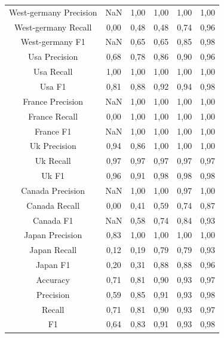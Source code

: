 \documentclass{classrep}
\begin{document}
\begin{table}[h!]
\begin{tabular}{c c c c c c}
\hline
West-germany Precision 	& NaN & 1,00 & 1,00 & 1,00 & 1,00\\
West-germany Recall 		& 0,00 & 0,48 & 0,48 & 0,74 & 0,96\\
West-germany F1		& NaN & 0,65 & 0,65 & 0,85 & 0,98\\
\hline
Usa Precision 			& 0,68 & 0,78 & 0,86 & 0,90 & 0,96\\
Usa Recall				& 1,00 & 1,00 & 1,00 & 1,00 & 1,00\\
Usa F1			 	& 0,81 & 0,88 & 0,92 & 0,94 & 0,98\\
\hline
France Precision 		& NaN & 1,00 & 1,00 & 1,00 & 1,00\\
France Recall 			& 0,00 & 1,00 & 1,00 & 1,00 & 1,00\\
France F1 				& NaN & 1,00 & 1,00 & 1,00 & 1,00\\
\hline
Uk Precision 			& 0,94 & 0,86 & 1,00 & 1,00 & 1,00\\
Uk Recall 				& 0,97 & 0,97 & 0,97 & 0,97 & 0,97\\
Uk F1 				& 0,96 & 0,91 & 0,98 & 0,98 & 0,98\\
\hline
Canada Precision		& NaN & 1,00 & 1,00 & 0,97 & 1,00\\
Canada Recall 			& 0,00 & 0,41 & 0,59 & 0,74 & 0,87\\
Canada F1 			& NaN & 0,58 & 0,74 & 0,84 & 0,93\\
\hline
Japan Precision  		& 0,83 & 1,00 & 1,00 & 1,00 & 1,00\\
Japan Recall 			& 0,12 & 0,19 & 0,79 & 0,79 & 0,93\\
Japan F1 				& 0,20 & 0,31 & 0,88 & 0,88 & 0,96\\
\hline
Accuracy 				& 0,71 & 0,81 & 0,90 & 0,93 & 0,97\\
Precision 				& 0,59 & 0,85 & 0,91 & 0,93 & 0,98\\
Recall 				& 0,71 & 0,81 & 0,90 & 0,93 & 0,97\\
F1 					& 0,64 & 0,83 & 0,91 & 0,93 & 0,98\\

\end {tabular}
\label {t4}
\end{table}
\end{document}
